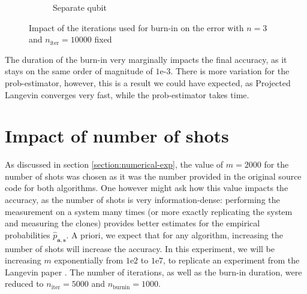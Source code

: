 \documentclass[12pt]{memoir}
\newcommand{\mb}{\mathbf}
\newcommand{\nitern}[1]{$n_{\text{iter}}=#1$}
\newcommand{\nburninn}[1]{$n_{\text{burnin}}=#1$}
\begin{document}
\begin{figure}[H]
\begin{subfigure}[b]{0.49\textwidth}
        \caption{Separate qubit}

        \label{fig:burnin-comp-sep-DG-sub}

    \end{subfigure}

    \caption{Impact of the iterations used for burn-in on the error with $n=3$ and \nitern{10000} fixed}

    \label{fig:burnin-comp}

\end{figure}

The duration of the burn-in very marginally impacts the final accuracy, as it stays on the same order of magnitude of $1\text{e-}3$. There is more variation for the prob-estimator, however, this is a result we could have expected, as Projected Langevin converges very fast, while the prob-estimator takes time.


\section{Impact of number of shots}\label{section:comp-nb-shots}


As discussed in section \ref{section:numerical-exp}, the value of $m=2000$ for the number of shots was chosen as it was the number provided in the original source code for both algorithms. One however might ask how this value impacts the accuracy, as the number of shots is very information-dense: performing the measurement on a system many times (or more exactly replicating the system and measuring the clones) provides better estimates for the empirical probabilities $\hat p_{\mb a, \mb s}$. A priori, we expect that for any algorithm, increasing the number of shots will increase the accuracy. In this experiment, we will be increasing $m$ exponentially from $1\text{e}2$ to $1\text{e}7$, to replicate an experiment from the Langevin paper \cite{meth:bayesian:Langevin:ACMT2024}. The number of iterations, as well as the burn-in duration, were reduced to \nitern{5000} and \nburninn{1000}.
\end{document}
